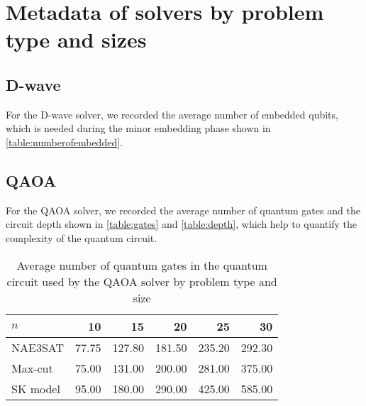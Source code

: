 \chapter{Metadata of solvers by problem type and sizes}\label{appendix:metadata}

\section{D-wave}
For the D-wave solver, we recorded the average number of embedded qubits, which is needed during the minor embedding phase shown in \autoref{table:numberofembedded}.

\begin{table}[!ht]
    \centering
    \caption{Average number of embedded qubits for the D-wave solver by problem type and size}
    \label{table:numberofembedded}
\end{table}

\section{QAOA}
For the QAOA solver, we recorded the average number of quantum gates and the circuit depth shown in \autoref{table:gates} and \autoref{table:depth}, which help to quantify the complexity of the quantum circuit.

\begin{table}[!ht]
    \centering
    \begin{tabular}{lrrrrr} \toprule
        $n$ & 10 & 15 & 20 & 25 & 30\\ \midrule
        NAE3SAT & 77.75 & 127.80 & 181.50 & 235.20 & 292.30 \\
        Max-cut & 75.00 & 131.00 & 200.00 & 281.00 & 375.00 \\
        SK model & 95.00 & 180.00 & 290.00 & 425.00 & 585.00\\ \bottomrule
    \end{tabular}
    \caption{Average number of quantum gates in the quantum circuit used by the QAOA solver by problem type and size}
    \label{table:gates}
\end{table}

